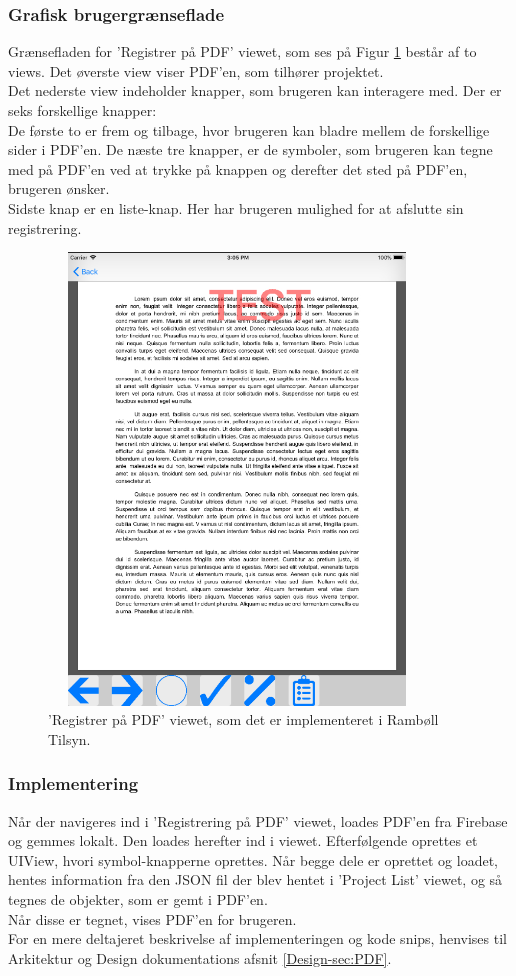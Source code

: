 \subsubsection{Grafisk brugergrænseflade}
Grænsefladen for 'Registrer på PDF' viewet, som ses på Figur \ref{fig:RegistrerObjekterView} består af to views. 
Det øverste view viser PDF'en, som tilhører projektet. \\
Det nederste view indeholder knapper, som brugeren kan interagere med. Der er seks forskellige knapper: \\
De første to er frem og tilbage, hvor brugeren kan bladre mellem de forskellige sider i PDF'en. De næste tre knapper, er de symboler, som brugeren kan tegne med på PDF'en ved at trykke på knappen og derefter det sted på PDF'en, brugeren ønsker. \\
Sidste knap er en liste-knap. Her har brugeren mulighed for at afslutte sin registrering.
\begin{figure}[H] %
	\centering
	\includegraphics[height=12cm, width=10cm]{Design/Applikation/RegistrePDF/PDF}
	\caption{'Registrer på PDF' viewet, som det er implementeret i Rambøll Tilsyn.}
	\label{fig:RegistrerObjekterView}
\end{figure}

\subsubsection{Implementering}
Når der navigeres ind i 'Registrering på PDF' viewet, loades PDF'en fra Firebase og gemmes lokalt. Den loades herefter ind i viewet. Efterfølgende oprettes et UIView, hvori symbol-knapperne oprettes. Når begge dele er oprettet og loadet, hentes information fra den JSON fil der blev hentet i 'Project List' viewet, og så tegnes de objekter, som er gemt i PDF'en. \\
Når disse er tegnet, vises PDF'en for brugeren. \\
For en mere deltajeret beskrivelse af implementeringen og kode snips, henvises til Arkitektur og Design dokumentations afsnit \ref{Design-sec:PDF}.


\clearpage